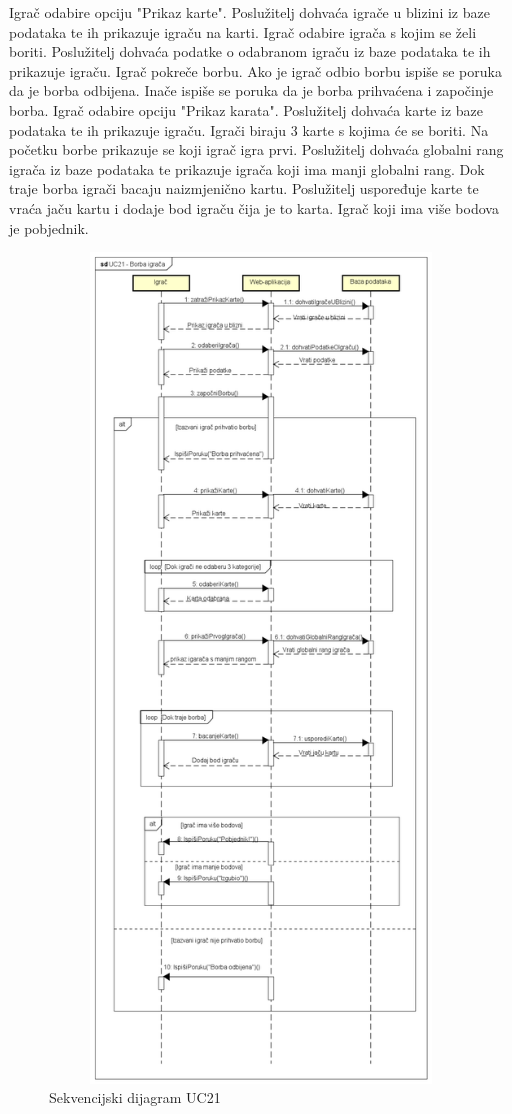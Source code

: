 					{Igrač odabire opciju "Prikaz karte". Poslužitelj dohvaća igrače u blizini iz baze podataka te ih prikazuje igraču na karti. Igrač odabire igrača s kojim se želi boriti. Poslužitelj dohvaća podatke o odabranom igraču iz baze podataka te ih prikazuje igraču. Igrač pokreče borbu. Ako je igrač odbio borbu ispiše se poruka da je borba odbijena. Inače ispiše se poruka da je borba prihvaćena i započinje borba. Igrač odabire opciju "Prikaz karata". Poslužitelj dohvaća karte iz baze podataka te ih prikazuje igraču. Igrači biraju 3 karte s kojima će se boriti. Na početku borbe prikazuje se koji igrač igra prvi. Poslužitelj dohvaća globalni rang igrača iz baze podataka te prikazuje igrača koji ima manji globalni rang. Dok traje borba igrači bacaju naizmjenično kartu. Poslužitelj uspoređuje karte te vraća jaču kartu i dodaje bod igraču čija je to karta. Igrač koji ima više bodova je pobjednik.}\\
					
					\begin{figure}[H]
						\includegraphics[width=13cm, height=22cm]{dijagrami/sd_UC21}				
						\centering
						\caption{Sekvencijski dijagram UC21}
						\label{}
					\end{figure}
				\newpage
				
